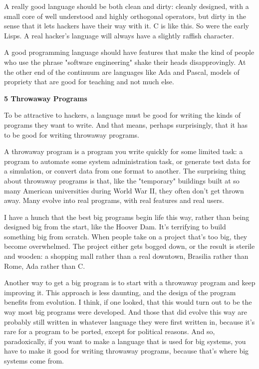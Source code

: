 A really good language should be both clean
                  and dirty: cleanly designed, with a small core of well
                  understood and highly orthogonal operators, but dirty in the
                  sense that it lets hackers have their way with it. C is like
                  this. So were the early Lisps. A real hacker's language will
                  always have a slightly raffish character.

A good
                  programming language should have features that make the kind
                  of people who use the phrase "software engineering" shake
                  their heads disapprovingly. At the other end of the continuum
                  are languages like Ada and Pascal, models of propriety that
                  are good for teaching and not much else.

\textbf{5 Throwaway Programs}

To be attractive to hackers, a language must be
                  good for writing the kinds of programs they want to write. And
                  that means, perhaps surprisingly, that it has to be good for
                  writing throwaway programs.

A throwaway program is
                  a program you write quickly for some limited task: a program
                  to automate some system administration task, or generate test
                  data for a simulation, or convert data from one format to
                  another. The surprising thing about throwaway programs is
                  that, like the "temporary" buildings built at so many American
                  universities during World War II, they often don't get thrown
                  away. Many evolve into real programs, with real features and
                  real users.

I have a hunch that the best big
                  programs begin life this way, rather than being designed big
                  from the start, like the Hoover Dam. It's terrifying to build
                  something big from scratch. When people take on a project
                  that's too big, they become overwhelmed. The project either
                  gets bogged down, or the result is sterile and wooden: a
                  shopping mall rather than a real downtown, Brasilia rather
                  than Rome, Ada rather than C.

Another way to get a
                  big program is to start with a throwaway program and keep
                  improving it. This approach is less daunting, and the design
                  of the program benefits from evolution. I think, if one
                  looked, that this would turn out to be the way most big
                  programs were developed. And those that did evolve this way
                  are probably still written in whatever language they were
                  first written in, because it's rare for a program to be
                  ported, except for political reasons. And so, paradoxically,
                  if you want to make a language that is used for big systems,
                  you have to make it good for writing throwaway programs,
                  because that's where big systems come from.

